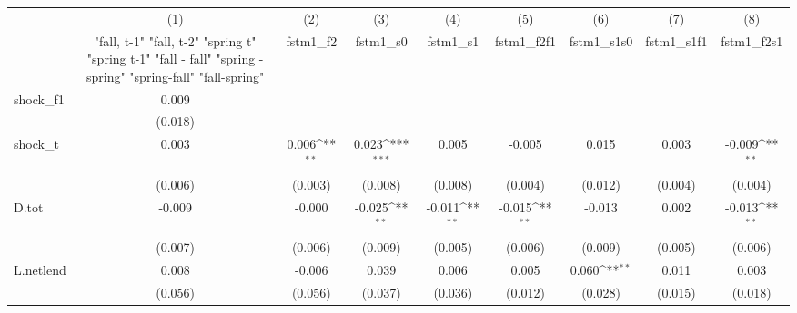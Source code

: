 {
\def\sym#1{\ifmmode^{#1}\else\(^{#1}\)\fi}
\begin{tabular}{l*{8}{c}}
\toprule
            &\multicolumn{1}{c}{(1)}&\multicolumn{1}{c}{(2)}&\multicolumn{1}{c}{(3)}&\multicolumn{1}{c}{(4)}&\multicolumn{1}{c}{(5)}&\multicolumn{1}{c}{(6)}&\multicolumn{1}{c}{(7)}&\multicolumn{1}{c}{(8)}\\
            &\multicolumn{1}{c}{  "fall, t-1" "fall, t-2" "spring t" "spring t-1"  "fall - fall" "spring - spring" "spring-fall" "fall-spring" }&\multicolumn{1}{c}{fstm1\_f2}&\multicolumn{1}{c}{fstm1\_s0}&\multicolumn{1}{c}{fstm1\_s1}&\multicolumn{1}{c}{fstm1\_f2f1}&\multicolumn{1}{c}{fstm1\_s1s0}&\multicolumn{1}{c}{fstm1\_s1f1}&\multicolumn{1}{c}{fstm1\_f2s1}\\
\midrule
shock\_f1    &       0.009         &                     &                     &                     &                     &                     &                     &                     \\
            &     (0.018)         &                     &                     &                     &                     &                     &                     &                     \\
\addlinespace
shock\_t     &       0.003         &       0.006\sym{**} &       0.023\sym{***}&       0.005         &      -0.005         &       0.015         &       0.003         &      -0.009\sym{**} \\
            &     (0.006)         &     (0.003)         &     (0.008)         &     (0.008)         &     (0.004)         &     (0.012)         &     (0.004)         &     (0.004)         \\
\addlinespace
D.tot       &      -0.009         &      -0.000         &      -0.025\sym{**} &      -0.011\sym{**} &      -0.015\sym{**} &      -0.013         &       0.002         &      -0.013\sym{**} \\
            &     (0.007)         &     (0.006)         &     (0.009)         &     (0.005)         &     (0.006)         &     (0.009)         &     (0.005)         &     (0.006)         \\
\addlinespace
L.netlend   &       0.008         &      -0.006         &       0.039         &       0.006         &       0.005         &       0.060\sym{**} &       0.011         &       0.003         \\
            &     (0.056)         &     (0.056)         &     (0.037)         &     (0.036)         &     (0.012)         &     (0.028)         &     (0.015)         &     (0.018)         \\

\end{tabular}}

